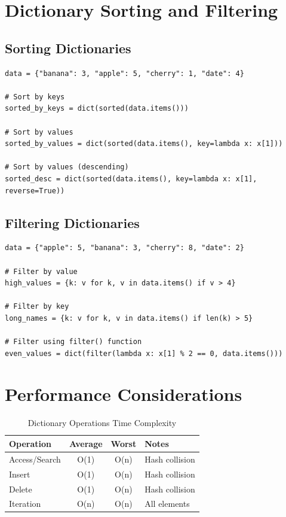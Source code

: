 \documentclass[12pt,a4paper]{article}
\begin{document}
\section{Dictionary Sorting and Filtering}

\subsection{Sorting Dictionaries}

\begin{lstlisting}
data = {"banana": 3, "apple": 5, "cherry": 1, "date": 4}

# Sort by keys
sorted_by_keys = dict(sorted(data.items()))

# Sort by values
sorted_by_values = dict(sorted(data.items(), key=lambda x: x[1]))

# Sort by values (descending)
sorted_desc = dict(sorted(data.items(), key=lambda x: x[1], reverse=True))
\end{lstlisting}

\subsection{Filtering Dictionaries}

\begin{lstlisting}
data = {"apple": 5, "banana": 3, "cherry": 8, "date": 2}

# Filter by value
high_values = {k: v for k, v in data.items() if v > 4}

# Filter by key
long_names = {k: v for k, v in data.items() if len(k) > 5}

# Filter using filter() function
even_values = dict(filter(lambda x: x[1] % 2 == 0, data.items()))
\end{lstlisting}

\section{Performance Considerations}

\begin{table}[h]
\centering
\begin{tabular}{|l|c|c|l|}
\hline
\textbf{Operation} & \textbf{Average} & \textbf{Worst} & \textbf{Notes} \\
\hline
Access/Search & O(1) & O(n) & Hash collision \\
Insert & O(1) & O(n) & Hash collision \\
Delete & O(1) & O(n) & Hash collision \\
Iteration & O(n) & O(n) & All elements \\
\hline
\end{tabular}
\caption{Dictionary Operations Time Complexity}
\end{table}
\end{document}
